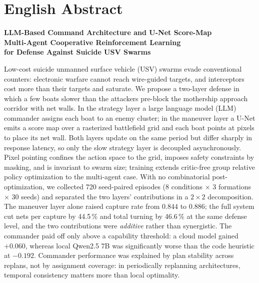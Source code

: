 
\section*{English Abstract}

\noindent\textbf{\large LLM-Based Command Architecture and U-Net Score-Map\\
Multi-Agent Cooperative Reinforcement Learning\\
for Defense Against Suicide USV Swarms}

\vspace{4pt}
\noindent
Low-cost suicide unmanned surface vehicle (USV) swarms evade conventional counters:
electronic warfare cannot reach wire-guided targets, and interceptors cost more than their
targets and saturate. We propose a two-layer defense in which a few boats slower than the
attackers pre-block the mothership approach corridor with net walls. In the strategy layer a
large language model (LLM) commander assigns each boat to an enemy cluster; in the maneuver
layer a U-Net emits a score map over a rasterized battlefield grid and each boat points at
pixels to place its net wall. Both layers update on the same period but differ sharply in
response latency, so only the slow strategy layer is decoupled asynchronously. Pixel pointing
confines the action space to the grid, imposes safety constraints by masking, and is
invariant to swarm size; training extends critic-free group relative policy optimization to
the multi-agent case. With no combinatorial post-optimization, we collected
720 seed-paired episodes (8 conditions $\times$ 3 formations $\times$ 30 seeds) and separated
the two layers' contributions in a $2\times2$ decomposition. The maneuver layer alone raised
capture rate from $0.844$ to $0.886$; the full system cut nets per capture by 44.5\,\% and total
turning by 46.6\,\% at the same defense level, and the two contributions were \emph{additive}
rather than synergistic. The commander paid off only above a capability threshold: a cloud
model gained $+0.060$, whereas local Qwen2.5 7B was significantly worse than the code heuristic
at $-0.192$. Commander performance was explained by plan stability across replans, not by
assignment coverage: in periodically replanning architectures, temporal consistency matters
more than local optimality.

